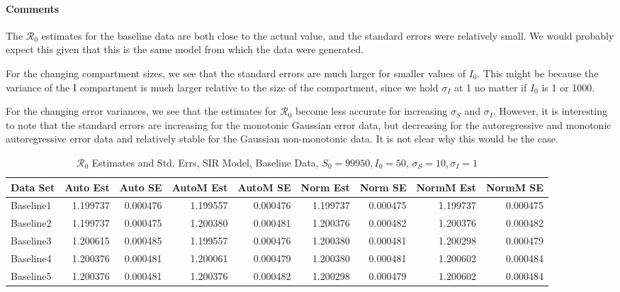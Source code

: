 \documentclass[12pt]{article}
\newcommand{\rr}{\ensuremath{\mathcal{R}_0}}
\begin{document}
\paragraph{Comments}

The $\rr$ estimates for the baseline data are both close to the actual value, and the standard errors were relatively small. We would probably expect this given that this is the same model from which the data were generated. 

For the changing compartment sizes, we see that the standard errors are much larger for smaller values of $I_0$. This might be because the variance of the I compartment is much larger relative to the size of the compartment, since we hold $\sigma_I$ at 1 no matter if $I_0$ is 1 or 1000. 

For the changing error variances, we see that the estimates for $\rr$ become less accurate for increasing $\sigma_S$ and $\sigma_I$. However, it is interesting to note that the standard errors are increasing for the monotonic Gaussian error data, but decreasing for the autoregressive and monotonic autoregressive error data and relatively stable for the Gaussian non-monotonic data. It is not clear why this would be the case.


\begin{table}[H]
	\caption{$\rr$ Estimates and Std. Errs, SIR Model, 
		Baseline Data, $S_0 = 99950, I_0 = 50$, 
		$\sigma_S = 10, \sigma_I = 1$}
	\begin{footnotesize}
		\hskip -1cm
	\begin{tabular}{l|r|r|r|r|r|r|r|r}
		\hline
		Data Set & Auto Est & Auto SE & AutoM Est & AutoM SE & Norm Est & Norm SE & NormM Est & NormM SE\\
		\hline
		Baseline1 & 1.199737 & 0.000476 & 1.199557 & 0.000476 & 1.199737 & 0.000475 & 1.199737 & 0.000475\\
		\hline
		Baseline2 & 1.199737 & 0.000475 & 1.200380 & 0.000481 & 1.200376 & 0.000482 & 1.200376 & 0.000482\\
		\hline
		Baseline3 & 1.200615 & 0.000485 & 1.199557 & 0.000476 & 1.200380 & 0.000481 & 1.200298 & 0.000479\\
		\hline
		Baseline4 & 1.200376 & 0.000481 & 1.200061 & 0.000479 & 1.200380 & 0.000481 & 1.200602 & 0.000484\\
		\hline
		Baseline5 & 1.200376 & 0.000481 & 1.200376 & 0.000482 & 1.200298 & 0.000479 & 1.200602 & 0.000484\\
		\hline
	\end{tabular}
	\end{footnotesize}
\end{table}
\end{document}
